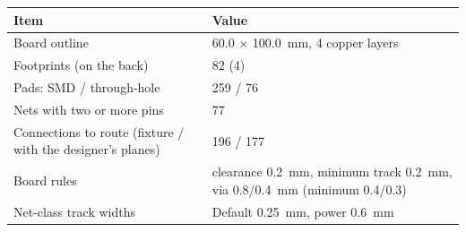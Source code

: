 \begin{tabular}{p{5.6cm}p{8.2cm}}
\toprule
Item & Value \\
\midrule
Board outline & 60.0 $\times$ 100.0~mm, 4 copper layers \\
Footprints (on the back) & 82 (4) \\
Pads: SMD / through-hole & 259 / 76 \\
Nets with two or more pins & 77 \\
Connections to route (fixture / with the designer's planes) & 196 / 177 \\
Board rules & clearance 0.2~mm, minimum track 0.2~mm, via 0.8/0.4~mm (minimum 0.4/0.3) \\
Net-class track widths & Default 0.25~mm, power 0.6~mm \\
\bottomrule
\end{tabular}
